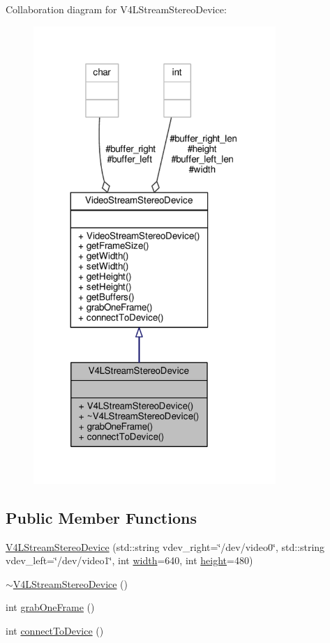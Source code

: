 Collaboration diagram for V4\+L\+Stream\+Stereo\+Device\+:
\nopagebreak
\begin{figure}[H]
\begin{center}
\leavevmode
\includegraphics[width=260pt]{classV4LStreamStereoDevice__coll__graph}
\end{center}
\end{figure}
\subsection*{Public Member Functions}
\begin{DoxyCompactItemize}
\item 
\hyperlink{classV4LStreamStereoDevice_a8b5178fdbc4f381c088fdf2e7c098551}{V4\+L\+Stream\+Stereo\+Device} (std\+::string vdev\+\_\+right=\char`\"{}/dev/video0\char`\"{}, std\+::string vdev\+\_\+left=\char`\"{}/dev/video1\char`\"{}, int \hyperlink{classVideoStreamStereoDevice_a87596748c13021a3623bb55de4c9be14}{width}=640, int \hyperlink{classVideoStreamStereoDevice_a97af0c098374ce089e71d9020b792f1f}{height}=480)
\item 
\hyperlink{classV4LStreamStereoDevice_a27feadb2023f0293915353a749fa866d}{$\sim$\+V4\+L\+Stream\+Stereo\+Device} ()
\item 
int \hyperlink{classV4LStreamStereoDevice_af5170cee3401eb70e771b56fbf2104d7}{grab\+One\+Frame} ()
\item 
int \hyperlink{classV4LStreamStereoDevice_a0ecb2dd2636fcbfccc0e43604bf9bd14}{connect\+To\+Device} ()
\end{DoxyCompactItemize}
